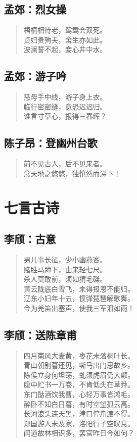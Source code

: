 \documentclass[12pt,oneside]{book}
\newenvironment{shici}{%
\begin{verse}\centering\yanti\large\hspace{12pt}}{\end{verse}}
\begin{document}
\begin{common-format}
\chapter{孟郊：烈女操}
\begin{shici}
梧桐相待老，鸳鸯会双死。\\
贞妇贵殉夫，舍生亦如此。\\
波澜誓不起，妾心井中水。
\end{shici}

\chapter{孟郊：游子吟}
\begin{shici}
慈母手中线，游子身上衣。\\
临行密密缝，意恐迟迟归。\\
谁言寸草心，报得三春辉？
\end{shici}

\chapter{陈子昂：登幽州台歌}
\begin{shici}
前不见古人，后不见来者。\\
念天地之悠悠，独怆然而涕下！
\end{shici}

\part{七言古诗}
\chapter{李颀：古意}
\begin{shici}
男儿事长征，少小幽燕客。\\
赌胜马蹄下，由来轻七尺。\\
杀人莫敢前，须如猬毛磔。\\
黄云陇底白雪飞，未得报恩不能归。\\
辽东小妇年十五，惯弹琵琶解歌舞。\\
今为羌笛出塞声，使我三军泪如雨！
\end{shici}

\chapter{李颀：送陈章甫}
\begin{shici}
四月南风大麦黄，枣花未落桐叶长。\\
青山朝别暮还见，嘶马出门思故乡。\\
陈侯立身何坦荡，虬须虎眉仍大颡。\\
腹中贮书一万卷，不肯低头在草莽。\\
东门酤酒饮我曹，心轻万事皆鸿毛。\\
醉卧不知白日暮，有时空望孤云高。\\
长河浪头连天黑，津口停舟渡不得。\\
郑国游人未及家，洛阳行子空叹息。\\
闻道故林相识多，罢官昨日今如何？
\end{shici}


\end{common-format}
\end{document}
